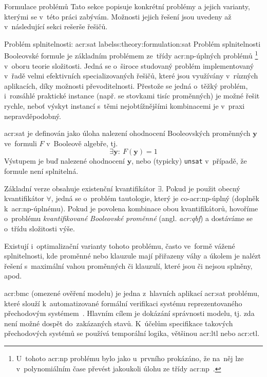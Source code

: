 \documentclass[thesis=M,czech]{FITthesis}[2012/06/26]
\newcommand{\acrlabel}[1]{acr:#1}
\newcommand{\acr}[1]{\acrshort{\acrlabel{#1}}}
\newcommand{\acrf}[1]{\acrfull{\acrlabel{#1}}}
\newcommand{\id}[1]{\texttt{#1}}
\newcommand{\hl}[1]{\textit{#1}}
\newcommand{\name}[1]{\hl{#1}}
\newcommand{\cit}[1]{\cite{#1}}
\renewcommand{\vec}[1]{\ensuremath{\boldsymbol{#1}}}
\begin{document}
\begin{section}{Formulace problémů}\label{s:theory:formulation}
Tato sekce popisuje konkrétní problémy a jejich varianty,
kterými se v~této práci zabývám.
Možnosti jejich řešení jsou uvedeny až v~následující sekci rešerše řešičů.


\begin{subsection}{Problém splnitelnosti: \acr{sat}}
label{ss:theory:formulation:sat}
Problém splnitelnosti Booleovské formule
je základním problémem
ze~třídy \acr{np}-úplných problémů%
\footnote{U~tohoto \acr{np} problému
bylo jako u~prvního prokázáno,
že na~něj lze v~polynomiálním čase převést
jakoukoli úlohu ze třídy \acr{np}~\cit{cook-art}.}
v~oboru teorie složitosti.
Jedná se o~široce studovaný problém
implementovaný v~řadě velmi efektivních specializovaných řešičů,
které jsou využívány v~různých aplikacích,
díky možnosti převoditelnosti.
Přestože se jedná o~těžký problém,
i~rozsáhlé praktické instance
(např. se stovkami tisíc proměnných)
je možné řešit rychle,
neboť výskyt instancí s~těmi nejobtížnějšími kombinacemi
je v~praxi nepravděpodobný.

\acr{sat} je definován jako úloha nalezení ohodnocení
Booleovských proměnných \vec{y}
ve~formuli $F$ v~Booleově algebře,
tj.
\begin{equation}\label{eq:sat}
   \exists \vec{y} : \: F(\vec{y}) = 1
\end{equation}
Výstupem je buď nalezené ohodnocení \vec{y},
nebo (typicky) \id{unsat} v~případě, že formule není splnitelná.

Základní verze obsahuje existenční kvantifikátor $\exists$.
Pokud je použit obecný kvantifikátor $\forall$,
jedná se o~problém tautologie, který je co-\acr{np}-úplný
(doplněk k~\acr{np}-úplnému).
Pokud je povolena kombinace obou kvantifikátorů,
hovoříme o~problému \name{kvantifikované Booleovské proměnné}
(angl. \name{\acr{qbf}})
a dostáváme se o~třídu složitosti výše.

Existují i~optimalizační varianty tohoto problému,
často ve~formě vážené splnitelnosti,
kde proměnné nebo klauzule mají přiřazeny váhy
a úkolem je nalézt řešení s~maximální vahou
proměnných či klauzulí, které jsou či nejsou splněny, apod.


\begin{paragraph}{\acrf{bmc}}\label{p:theory:formulation:sat:bmc}
(omezené ověření modelu)
je jedna z~hlavních aplikací \acr{sat} problému,
které slouží k~automatizované formální verifikaci
systému reprezentovaného přechodovým systémem~\cit{bmc-art}.
Hlavním cílem je dokázání správnosti modelu,
tj. zda není možné dospět do~zakázaných stavů.
K~účelům specifikace takových přechodových systémů
se používá temporální logika,
většinou \acr{ltl} nebo \acr{ctl}.


\end{paragraph}
\end{subsection}
\end{section}
\end{document}
